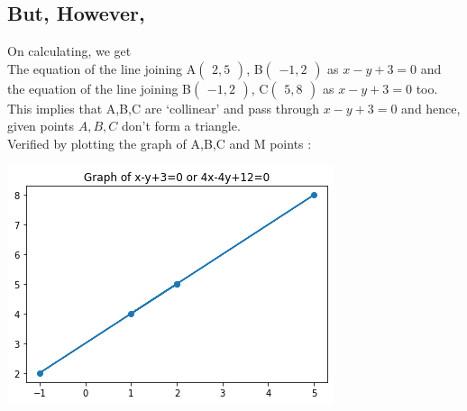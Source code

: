 \documentclass[journal,12pt,twocolumn]{IEEEtran}
\newcommand{\myvec}[1]{\ensuremath{\begin{pmatrix}#1\end{pmatrix}}}
\begin{document}
\subsection*{But, However,} On calculating, we get\\
The equation of the line joining A\myvec{2,5}, B\myvec{-1,2} as $x-y+3=0$ and \\
the equation of the line joining B\myvec{-1,2}, C\myvec{5,8} as $x-y+3=0$ too.\\

This implies that A,B,C are `collinear' and pass through $x-y+3=0$ and hence, given points $A,B,C$ don't form a triangle.\newline\\
Verified by plotting the graph of A,B,C and M points :
\begin{center}
  \includegraphics[scale=0.6]{prv1b.png}
\end{center}
    
\end{document}
